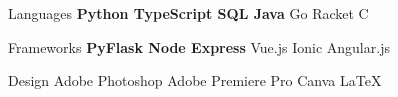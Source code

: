 

\begin{cvskills}

  \cvskill
  {Languages} %
  {\textbf{Python {\enskip\cdotp\enskip} TypeScript {\enskip\cdotp\enskip} SQL {\enskip\cdotp\enskip} Java } {\enskip\cdotp\enskip} Go {\enskip\cdotp\enskip} Racket {\enskip\cdotp\enskip} C } %

  \cvskill
  {Frameworks} %
  {\textbf{PyFlask {\enskip\cdotp\enskip} Node Express} {\enskip\cdotp\enskip} Vue.js {\enskip\cdotp\enskip} Ionic Angular.js}%



  \cvskill
  {Design} %
  {Adobe Photoshop {\enskip\cdotp\enskip} Adobe Premiere Pro {\enskip\cdotp\enskip} Canva {\enskip\cdotp\enskip} \LaTeX} %



\end{cvskills}
